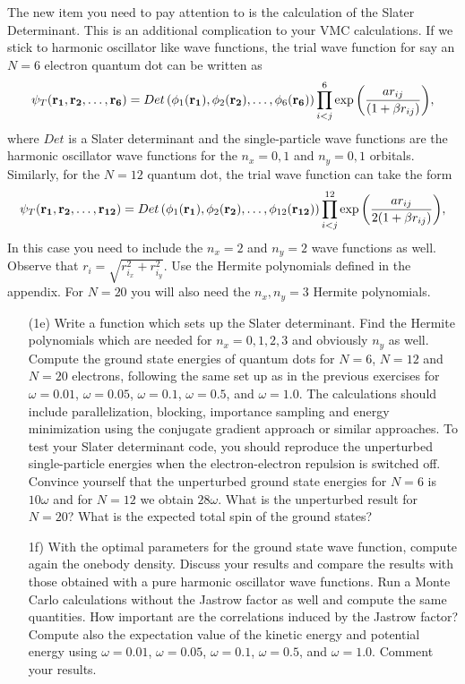 \documentclass[10pt]{article}
\begin{document}
The new item you need to pay attention to is the calculation of the Slater Determinant. This is an additional complication
to your VMC calculations.
If we stick to harmonic oscillator like wave functions,
the trial wave function for say an $N=6$ electron quantum dot can be written as 
\begin{equation}
   \psi_{T}({\bf r_1},{\bf r_2},\dots, {\bf r_6}) = 
   Det\left(\phi_{1}({\bf r_1}),\phi_{2}({\bf r_2}),
   \dots,\phi_{6}({\bf r_6})\right)
   \prod_{i<j}^{6}\exp{\left(\frac{a r_{ij}}{(1+\beta r_{ij})}\right)}, 
\end{equation}
where $Det$ is a Slater determinant and the single-particle wave functions
are the harmonic oscillator wave functions for the $n_x=0,1$ and $n_y=0,1$ orbitals. 
Similarly, for the $N=12$ quantum dot, the trial wave function can take the form
\begin{equation}
   \psi_{T}({\bf r_1},{\bf r_2}, \dots,{\bf r_{12}}) = 
   Det\left(\phi_{1}({\bf r_1}),\phi_{2}({\bf r_2}),
   \dots,\phi_{12}({\bf r_{12}})\right)
   \prod_{i<j}^{12}\exp{\left(\frac{ar_{ij}}{2(1+\beta r_{ij})}\right)}, 
\end{equation}
In this case you need to include the $n_x=2$ and $n_y=2$ wave functions as well.
Observe that $r_i = \sqrt{r_{i_x}^2+r_{i_y}^2}$.  Use the Hermite polynomials defined in the appendix.
For $N=20$ you will also need the $n_x,n_y=3$ Hermite polynomials.

\begin{enumerate}
\item[(1e)]   Write a function which sets up the Slater determinant. Find the Hermite polynomials which are needed for $n_x=0,1,2,3$ and obviously $n_y$ as well.
Compute the ground state energies of quantum dots for $N=6$, $N=12$ and $N=20$ electrons, following the same set up as in the previous exercises for $\omega=0.01$, $\omega=0.05$,
$\omega=0.1$, $\omega=0.5$, and $\omega=1.0$.
The calculations should include  parallelization, blocking, importance sampling and energy minimization using the conjugate gradient approach or similar approaches.
To test your Slater determinant code, you should reproduce the unperturbed single-particle energies
when the electron-electron repulsion is switched off. Convince yourself that the unperturbed ground state energies for $N=6$ is $10\omega$ and for $N=12$ we obtain $28\omega$.  What is the unperturbed result for $N=20$? What is the expected total 
spin of the ground states?
  
\item[1f)]  With the optimal parameters for the ground state wave function, compute again the onebody density. Discuss your results and compare the results with those obtained with a pure harmonic oscillator  
wave functions. Run a Monte Carlo calculations without the Jastrow factor as well
and compute the same quantities. How important are the correlations induced by the Jastrow factor?
Compute also the expectation value of the kinetic energy and potential energy using $\omega=0.01$,
$\omega=0.05$, $\omega=0.1$, $\omega=0.5$, and $\omega=1.0$. Comment your results.
\end{enumerate}
\end{document}
